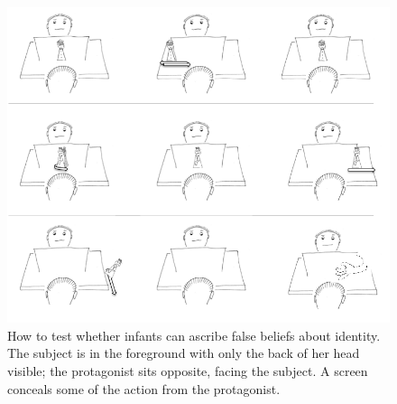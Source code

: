 \documentclass[12pt,\papersize]{extarticle}
\begin{document}
\begin{figure}
\begin{center}
\includegraphics[width=\textwidth]{figure_charlie_samantha_experiment.png}
\caption{
\label{figure:charlie_samantha_experiment}
	How to test whether infants can ascribe false beliefs about identity.  The subject is in the foreground with only the back of  her head visible; the protagonist sits opposite, facing the subject.  A screen conceals some of the action from the protagonist.
}
\end{center}
\end{figure}
\end{document}
